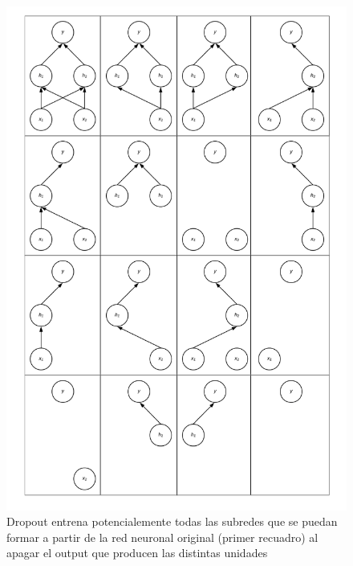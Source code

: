\begin{figure}[H]
\captionsetup{font=small,labelfont=small}
\caption{Dropout entrena potencialemente todas las subredes que se puedan formar a partir de la red neuronal original (primer recuadro) al apagar el output que producen las distintas unidades}
\centering
\includegraphics[scale=.25]{img/cap7_Dropout.png}
\end{figure}

